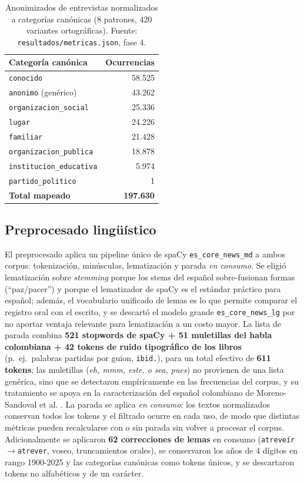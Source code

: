 \documentclass[11pt]{tg_usta}
\begin{document}
\begin{table}[htbp]
    \centering
    \caption{Anonimizados de entrevistas normalizados a categorías canónicas (8 patrones, 420 variantes ortográficas). Fuente: \texttt{resultados/metricas.json}, fase 4.}
    \small
    \setlength{\tabcolsep}{6pt}
    \begin{tabular}{l r}
    \toprule
    Categoría canónica & Ocurrencias \\
    \midrule
    \texttt{conocido} & 58.525 \\
    \texttt{anonimo} (genérico) & 43.262 \\
    \texttt{organizacion\_social} & 25.336 \\
    \texttt{lugar} & 24.226 \\
    \texttt{familiar} & 21.428 \\
    \texttt{organizacion\_publica} & 18.878 \\
    \texttt{institucion\_educativa} & 5.974 \\
    \texttt{partido\_politico} & 1 \\
    \midrule
    \textbf{Total mapeado} & \textbf{197.630} \\
    \bottomrule
    \end{tabular}
    \label{tab:anonimizados}
\end{table}

\subsection{Preprocesado lingüístico}

El preprocesado aplica un pipeline único de spaCy \texttt{es\_core\_news\_md} \cite{spacy2024model} a ambos corpus: tokenización, minúsculas, lematización y parada \textit{en consumo}. Se eligió lematización sobre \textit{stemming} porque los stems del español sobre-fusionan formas (``paz/pacer'') y porque el lematizador de spaCy es el estándar práctico para español; además, el vocabulario unificado de lemas es lo que permite comparar el registro oral con el escrito, y se descartó el modelo grande \texttt{es\_core\_news\_lg} por no aportar ventaja relevante para lematización a un costo mayor. La lista de parada combina \textbf{521 stopwords de spaCy + 51 muletillas del habla colombiana + 42 tokens de ruido tipográfico de los libros} (p.~ej.\ palabras partidas por guion, \texttt{ibid.}), para un total efectivo de \textbf{611 tokens}; las muletillas (\textit{eh, mmm, este, o sea, pues}) no provienen de una lista genérica, sino que se detectaron empíricamente en las frecuencias del corpus, y su tratamiento se apoya en la caracterización del español colombiano de Moreno-Sandoval et al. \cite{moreno2024detection}. La parada se aplica \textit{en consumo}: los textos normalizados conservan todos los tokens y el filtrado ocurre en cada uso, de modo que distintas métricas pueden recalcularse con o sin parada sin volver a procesar el corpus. Adicionalmente se aplicaron \textbf{62 correcciones de lemas} en consumo (\texttt{atreveír}$\rightarrow$\texttt{atrever}, voseo, truncamientos orales), se conservaron los años de 4 dígitos en rango 1900-2025 y las categorías canónicas como tokens únicos, y se descartaron tokens no alfabéticos y de un carácter.
\end{document}
